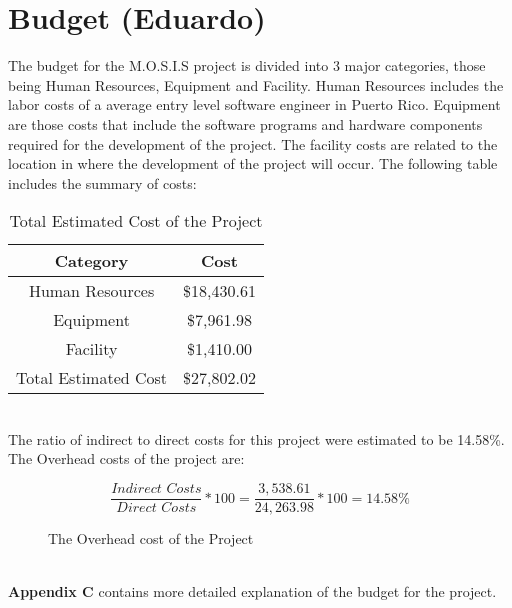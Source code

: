 
 \section{Budget (Eduardo)}
 The budget for the M.O.S.I.S project is divided into 3 major categories, those being Human Resources, Equipment and Facility. Human Resources includes the labor costs of a average entry level software engineer in Puerto Rico\cite{SoftwareEngineerSalary}. Equipment are those costs that include the software programs and hardware components required for the development of the project. The facility costs are related to the location in where the development of the project will occur. The following table includes the summary of costs:
 \begin{table}[h]
    \centering
    \begin{tabular}{||c | c||} 
     \hline
     \rowcolor{cyan}
     Category & Cost \\ [0.5ex] 
     \hline
     Human Resources & \$18,430.61\\ 
     \hline
     Equipment & \$7,961.98\\
     \hline
     Facility & \$1,410.00\\
     \hline
     \rowcolor{teal}
     Total Estimated Cost & \$27,802.02\\
     \hline
    \end{tabular}
    \caption {Total Estimated Cost of the Project}
    \label {table:1}
\end{table}
\\ The ratio of indirect to direct costs for this project were estimated to be 14.58\%.\\ The Overhead costs of the project are:
\begin{figure}[h]
   $$\frac{\textit{Indirect Costs}}{\textit{Direct Costs}} * 100 = \frac{3,538.61}{24,263.98} * 100 = 14.58\%$$
\caption{The Overhead cost of the Project}
\end{figure}
\\\textbf{Appendix C} contains more detailed explanation of the budget for the project.